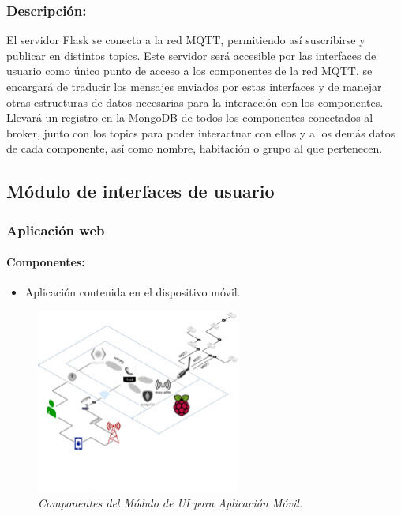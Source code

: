 \subsubsection{Descripción:}

El servidor Flask se conecta a la red MQTT, permitiendo así suscribirse y publicar en distintos topics. Este servidor será accesible por las interfaces de usuario como único punto de acceso a los componentes de la red MQTT, se encargará de traducir los mensajes enviados por estas interfaces y de manejar otras estructuras de datos necesarias para la interacción con los componentes. Llevará un registro en la MongoDB de todos los componentes conectados al broker, junto con los topics para poder interactuar con ellos y a los demás datos de cada componente, así como nombre, habitación o grupo al que pertenecen.

\subsection{Módulo de interfaces de usuario}

\subsubsection{Aplicación web}

\paragraph{Componentes:}

\begin{itemize}

\item Aplicación contenida en el dispositivo móvil.

\end{itemize}

\begin{figure}[h]
  \centering
  \includegraphics[width=0.6\textwidth, keepaspectratio]{images/mod-ui-webapp}
  \caption{\textit{Componentes del Módulo de UI para Aplicación Móvil.}}
  \label{fig:mod-ui-webapp}
\end{figure}

